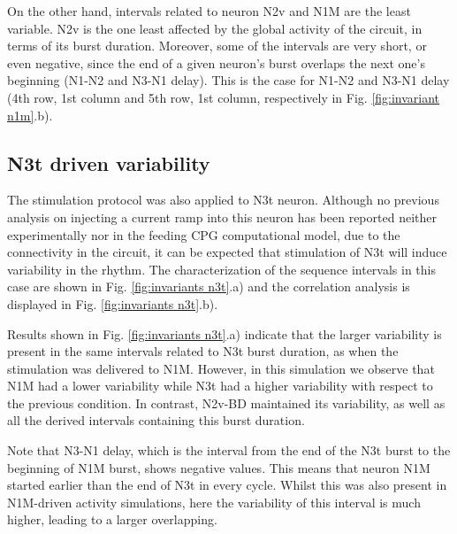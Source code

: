On the other hand, intervals related to neuron N2v and N1M are the least variable. N2v is the one least affected by the global activity of the circuit, in terms of its burst duration. Moreover, some of the intervals are very short, or even negative, since the end of a given neuron's burst overlaps the next one's beginning (N1-N2 and N3-N1 delay). This is the case for N1-N2 and N3-N1 delay (4th row, 1st column and 5th row, 1st column, respectively in Fig. \ref{fig:invariant n1m}.b).  




\subsection{N3t driven variability}
\label{subsec:n3t driven}

The stimulation protocol was also applied to N3t neuron. Although no previous analysis on injecting a current ramp into this neuron has been reported neither experimentally nor in the feeding CPG computational model, due to the connectivity in the circuit, it can be expected that stimulation of N3t will induce variability in the rhythm. The characterization of the sequence intervals in this case are shown in Fig. 
\ref{fig:invariants n3t}.a) and the correlation analysis is displayed in Fig. \ref{fig:invariants n3t}.b).


Results shown in Fig. \ref{fig:invariants n3t}.a) indicate that the larger variability is present in the same intervals related to N3t burst duration, as when the stimulation was delivered to N1M. However, in this simulation we observe that N1M had a lower variability while N3t had a higher variability with respect to the previous condition. 
In contrast, N2v-BD maintained its variability, as well as all the derived intervals containing this burst duration.

Note that N3-N1 delay, which is the interval from the end of the N3t burst to the beginning of N1M burst, shows negative values. This means that neuron N1M started earlier than the end of N3t in every cycle. Whilst this was also present in N1M-driven activity simulations, here the variability of this interval is much higher, leading to a larger overlapping.

